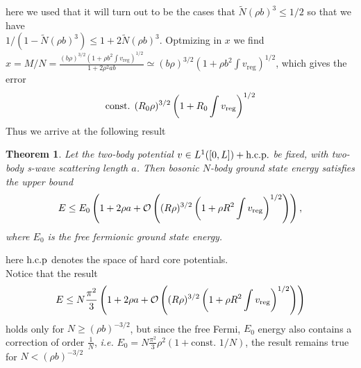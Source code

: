 \documentclass[a4paper,11pt]{article}
\newcommand{\ie}{\emph{i.e.} }
\newtheorem{theorem}{Theorem}
\numberwithin{equation}{section}
\begin{document}
	here we used that it will turn out to be the cases that $ \tilde{N}(\rho b)^3\leq 1/2 $ so that we have\\ $ 1/(1-\tilde{N}(\rho b)^3)\leq 1+2\tilde{N}(\rho b)^3 $.
	Optmizing in $ x $ we find $ x=M/N=\frac{(b\rho)^{3/2}\left(1+\rho b^2\int v_{\text{reg}}\right)^{1/2}}{1+2\rho^2 a b}\simeq(b\rho)^{3/2}\left(1+\rho b^2\int v_{\text{reg}}\right)^{1/2} $, which gives the error \begin{equation}
	\text{const. }(R_0\rho)^{3/2}\left(1+R_0 \int v_{\textnormal{reg}}\right)^{1/2}
	\end{equation}
	Thus we arrive at the following result
	\begin{theorem}
		Let the two-body potential $ v\in L^{1}([0,L])+\textnormal{h.c.p.} $ be fixed, with two-body s-wave scattering length $ a $. Then bosonic $ N $-body ground state energy satisfies the upper bound\begin{equation}
		E\leq E_0\left(1+2\rho a + \mathcal{O}\left((R\rho)^{3/2}\left(1+\rho R^2 \int v_{\textnormal{reg}}\right)^{1/2}\right)\right),
		\end{equation}
		where $ E_0 $ is the free fermionic ground state energy.
	\end{theorem}
	here $ \textnormal{h.c.p} $ denotes the space of hard core potentials.\\
	Notice that the result \begin{equation}
	E\leq N\frac{\pi^2}{3}\left(1+2\rho a + \mathcal{O}\left((R\rho)^{3/2}\left(1+\rho R^2 \int v_{\textnormal{reg}}\right)^{1/2}\right)\right)
	\end{equation}
	holds only for $ N\geq (\rho b)^{-3/2} $, but since the free Fermi, $ E_0 $ energy also contains a correction of order $ \frac{1}{N} $, \ie $ E_0=N\frac{\pi^2}{3}\rho^2(1+\text{const. }1/N) $, the result remains true for $ N<(\rho b)^{-3/2} $
\end{document}
